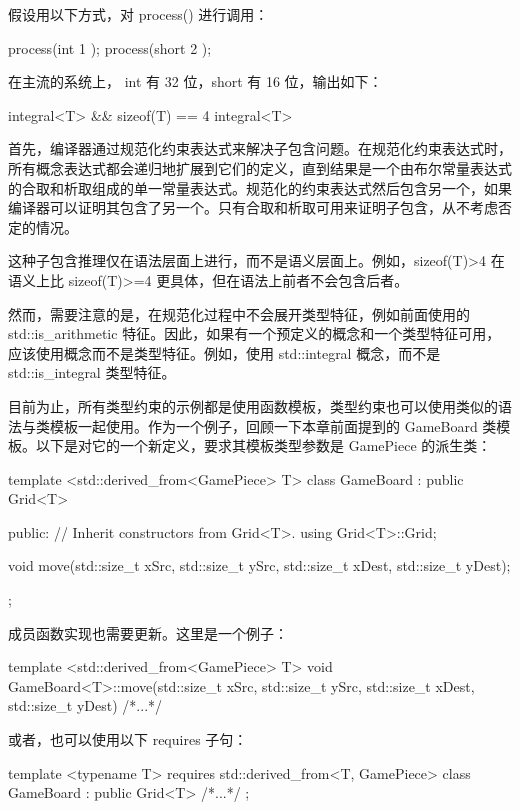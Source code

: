 假设用以下方式，对 process() 进行调用：

\begin{cpp}
process(int { 1 });
process(short { 2 });
\end{cpp}

在主流的系统上， int 有 32 位，short 有 16 位，输出如下：

\begin{shell}
integral<T> && sizeof(T) == 4
integral<T>
\end{shell}

首先，编译器通过规范化约束表达式来解决子包含问题。在规范化约束表达式时，所有概念表达式都会递归地扩展到它们的定义，直到结果是一个由布尔常量表达式的合取和析取组成的单一常量表达式。规范化的约束表达式然后包含另一个，如果编译器可以证明其包含了另一个。只有合取和析取可用来证明子包含，从不考虑否定的情况。

这种子包含推理仅在语法层面上进行，而不是语义层面上。例如，sizeof(T)>4 在语义上比 sizeof(T)>=4 更具体，但在语法上前者不会包含后者。

然而，需要注意的是，在规范化过程中不会展开类型特征，例如前面使用的 std::is\_arithmetic 特征。因此，如果有一个预定义的概念和一个类型特征可用，应该使用概念而不是类型特征。例如，使用 std::integral 概念，而不是 std::is\_integral 类型特征。


目前为止，所有类型约束的示例都是使用函数模板，类型约束也可以使用类似的语法与类模板一起使用。作为一个例子，回顾一下本章前面提到的 GameBoard 类模板。以下是对它的一个新定义，要求其模板类型参数是 GamePiece 的派生类：

\begin{cpp}
template <std::derived_from<GamePiece> T>
class GameBoard : public Grid<T>
{
    public:
        // Inherit constructors from Grid<T>.
        using Grid<T>::Grid;

        void move(std::size_t xSrc, std::size_t ySrc,
            std::size_t xDest, std::size_t yDest);
};
\end{cpp}

成员函数实现也需要更新。这里是一个例子：

\begin{cpp}
template <std::derived_from<GamePiece> T>
void GameBoard<T>::move(std::size_t xSrc, std::size_t ySrc,
    std::size_t xDest, std::size_t yDest) { /*...*/ }
\end{cpp}

或者，也可以使用以下 requires 子句：

\begin{cpp}
template <typename T> requires std::derived_from<T, GamePiece>
class GameBoard : public Grid<T> { /*...*/ };
\end{cpp}


